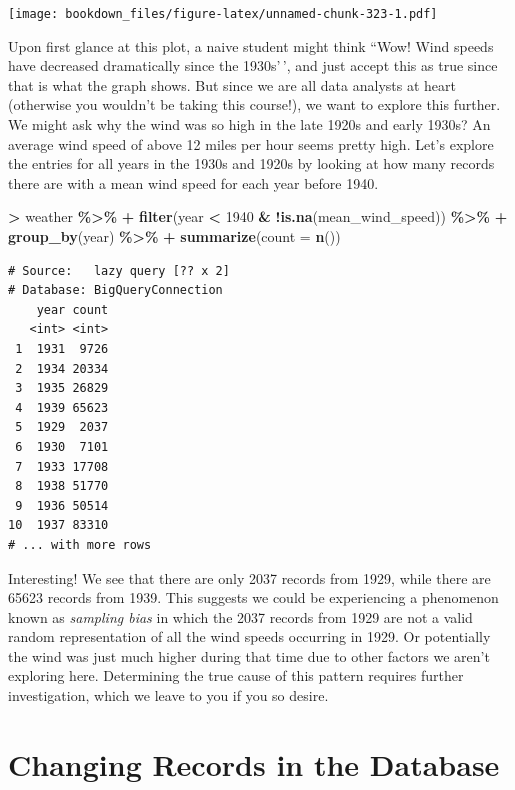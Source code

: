 \documentclass[
]{krantz}
\makeatletter
\newenvironment{Shaded}{\begin{snugshade}}{\end{snugshade}}
\newcommand{\DataTypeTok}[1]{\textcolor[rgb]{0.27,0.27,0.27}{#1}}
\newcommand{\DecValTok}[1]{\textcolor[rgb]{0.06,0.06,0.06}{#1}}
\newcommand{\KeywordTok}[1]{\textcolor[rgb]{0.27,0.27,0.27}{\textbf{#1}}}
\newcommand{\NormalTok}[1]{#1}
\newcommand{\OperatorTok}[1]{\textcolor[rgb]{0.43,0.43,0.43}{\textbf{#1}}}
\newcommand{\StringTok}[1]{\textcolor[rgb]{0.5,0.5,0.5}{#1}}
\newenvironment{kframe}{%
\medskip{}
\setlength{\fboxsep}{.8em}
 \def\at@end@of@kframe{}%
 \ifinner\ifhmode%
  \def\at@end@of@kframe{\end{minipage}}%
  \begin{minipage}{\columnwidth}%
 \fi\fi%
 \def\FrameCommand##1{\hskip\@totalleftmargin \hskip-\fboxsep
 \colorbox{shadecolor}{##1}\hskip-\fboxsep
     \hskip-\linewidth \hskip-\@totalleftmargin \hskip\columnwidth}%
 \MakeFramed {\advance\hsize-\width
   \@totalleftmargin\z@ \linewidth\hsize
   \@setminipage}}%
 {\par\unskip\endMakeFramed%
 \at@end@of@kframe}
\renewenvironment{Shaded}{\begin{kframe}}{\end{kframe}}
\makeatother
\begin{document}
\texttt{[image: bookdown\_files/figure-latex/unnamed-chunk-323-1.pdf]}

Upon first glance at this plot, a naive student might think ``Wow! Wind speeds have decreased dramatically since the 1930s'\,', and just accept this as true since that is what the graph shows. But since we are all data analysts at heart (otherwise you wouldn't be taking this course!), we want to explore this further. We might ask why the wind was so high in the late 1920s and early 1930s? An average wind speed of above 12 miles per hour seems pretty high. Let's explore the entries for all years in the 1930s and 1920s by looking at how many records there are with a mean wind speed for each year before 1940.

\begin{Shaded}
\begin{Highlighting}[]
\OperatorTok{\textgreater{}}\StringTok{ }\NormalTok{weather }\OperatorTok{\%\textgreater{}\%}
\OperatorTok{+}\StringTok{   }\KeywordTok{filter}\NormalTok{(year }\OperatorTok{\textless{}}\StringTok{ }\DecValTok{1940} \OperatorTok{\&}\StringTok{ }\OperatorTok{!}\KeywordTok{is.na}\NormalTok{(mean\_wind\_speed)) }\OperatorTok{\%\textgreater{}\%}
\OperatorTok{+}\StringTok{   }\KeywordTok{group\_by}\NormalTok{(year) }\OperatorTok{\%\textgreater{}\%}
\OperatorTok{+}\StringTok{   }\KeywordTok{summarize}\NormalTok{(}\DataTypeTok{count =} \KeywordTok{n}\NormalTok{())}
\end{Highlighting}
\end{Shaded}

\begin{verbatim}
# Source:   lazy query [?? x 2]
# Database: BigQueryConnection
    year count
   <int> <int>
 1  1931  9726
 2  1934 20334
 3  1935 26829
 4  1939 65623
 5  1929  2037
 6  1930  7101
 7  1933 17708
 8  1938 51770
 9  1936 50514
10  1937 83310
# ... with more rows
\end{verbatim}

Interesting! We see that there are only 2037 records from 1929, while there are 65623 records from 1939. This suggests we could be experiencing a phenomenon known as \emph{sampling bias} in which the 2037 records from 1929 are not a valid random representation of all the wind speeds occurring in 1929. Or potentially the wind was just much higher during that time due to other factors we aren't exploring here. Determining the true cause of this pattern requires further investigation, which we leave to you if you so desire.

\hypertarget{changing-records-in-the-database}{%
\section{Changing Records in the Database}\label{changing-records-in-the-database}}
\end{document}
